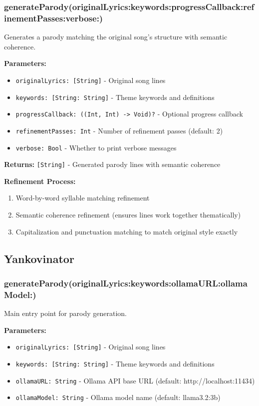 \documentclass[11pt,a4paper]{article}
\begin{document}
\subsubsection{generateParody(originalLyrics:keywords:progressCallback:refinementPasses:verbose:)}
Generates a parody matching the original song's structure with semantic coherence.

\textbf{Parameters:}
\begin{itemize}
    \item \texttt{originalLyrics: [String]} - Original song lines
    \item \texttt{keywords: [String: String]} - Theme keywords and definitions
    \item \texttt{progressCallback: ((Int, Int) -> Void)?} - Optional progress callback
    \item \texttt{refinementPasses: Int} - Number of refinement passes (default: 2)
    \item \texttt{verbose: Bool} - Whether to print verbose messages
\end{itemize}

\textbf{Returns:} \texttt{[String]} - Generated parody lines with semantic coherence

\textbf{Refinement Process:}
\begin{enumerate}
    \item Word-by-word syllable matching refinement
    \item Semantic coherence refinement (ensures lines work together thematically)
    \item Capitalization and punctuation matching to match original style exactly
\end{enumerate}

\subsection{Yankovinator}

\subsubsection{generateParody(originalLyrics:keywords:ollamaURL:ollamaModel:)}
Main entry point for parody generation.

\textbf{Parameters:}
\begin{itemize}
    \item \texttt{originalLyrics: [String]} - Original song lines
    \item \texttt{keywords: [String: String]} - Theme keywords and definitions
    \item \texttt{ollamaURL: String} - Ollama API base URL (default: http://localhost:11434)
    \item \texttt{ollamaModel: String} - Ollama model name (default: llama3.2:3b)
\end{itemize}
\end{document}

